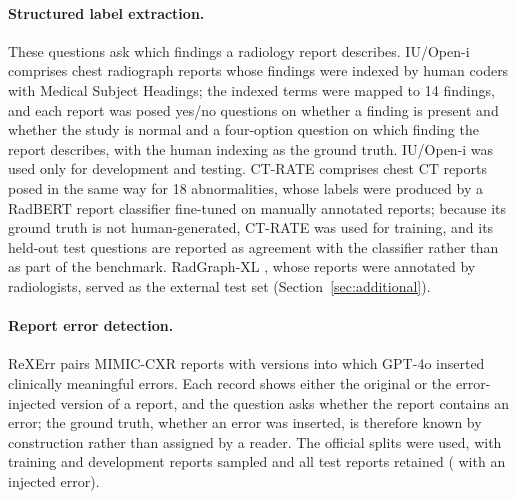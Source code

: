\documentclass[11pt]{article}
\begin{document}
\paragraph{Structured label extraction.} These questions ask which findings a radiology report describes. IU/Open-i \citep{demnerfushman2016iu} comprises chest radiograph reports whose findings were indexed by human coders with Medical Subject Headings; the indexed terms were mapped to 14 findings, and each report was posed yes/no questions on whether a finding is present and whether the study is normal and a four-option question on which finding the report describes, with the human indexing as the ground truth. IU/Open-i was used only for development and testing. CT-RATE \citep{hamamci2026ctrate} comprises chest CT reports posed in the same way for 18 abnormalities, whose labels were produced by a RadBERT report classifier fine-tuned on manually annotated reports; because its ground truth is not human-generated, CT-RATE was used for training, and its held-out test questions are reported as agreement with the classifier rather than as part of the benchmark. RadGraph-XL \citep{delbrouck2024radgraphxl}, whose reports were annotated by radiologists, served as the external test set (Section~\ref{sec:additional}).

\paragraph{Report error detection.} ReXErr \citep{rao2025rexerr} pairs MIMIC-CXR reports \citep{johnson2019mimiccxr} with versions into which GPT-4o inserted clinically meaningful errors. Each record shows either the original or the error-injected version of a report, and the question asks whether the report contains an error; the ground truth, whether an error was inserted, is therefore known by construction rather than assigned by a reader. The official splits were used, with  training and  development reports sampled and all  test reports retained ( with an injected error).
\end{document}
